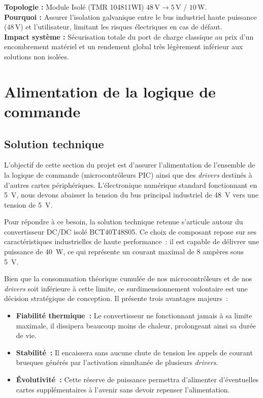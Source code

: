 \begin{decisionbox}
\textbf{Topologie :} Module Isolé (TMR 104811WI) $48 \, \text{V} \to 5 \, \text{V}$ / $10 \, \text{W}$. \\
\textbf{Pourquoi :} Assurer l'isolation galvanique entre le bus industriel haute puissance ($48 \, \text{V}$) et l'utilisateur, limitant les risques électriques en cas de défaut. \\
\textbf{Impact système :} Sécurisation totale du port de charge classique au prix d'un encombrement matériel et un rendement global très légèrement inférieur aux solutions non isolées.
\end{decisionbox}

    \section{Alimentation de la logique de commande}
        \subsection{Solution technique}
        L'objectif de cette section du projet est d'assurer l'alimentation de l'ensemble de la logique de commande (microcontrôleurs PIC) ainsi que des \textit{drivers} destinés à d'autres cartes périphériques. L'électronique numérique standard fonctionnant en 5~V, nous devons abaisser la tension du bus principal industriel de 48~V vers une tension de 5~V.

        Pour répondre à ce besoin, la solution technique retenue s'articule autour du convertisseur DC/DC isolé BCT40T48S05. Ce choix de composant repose sur ses caractéristiques industrielles de haute performance~: il est capable de délivrer une puissance de 40~W, ce qui représente un courant maximal de 8 ampères sous 5~V.

        Bien que la consommation théorique cumulée de nos microcontrôleurs et de nos \textit{drivers} soit inférieure à cette limite, ce surdimensionnement volontaire est une décision stratégique de conception. Il présente trois avantages majeurs~:
        \begin{itemize}
            \item \textbf{Fiabilité thermique~:} Le convertisseur ne fonctionnant jamais à sa limite maximale, il dissipera beaucoup moins de chaleur, prolongeant ainsi sa durée de vie.
            \item \textbf{Stabilité~:} Il encaissera sans aucune chute de tension les appels de courant brusques générés par l'activation simultanée de plusieurs \textit{drivers}.
            \item \textbf{Évolutivité~:} Cette réserve de puissance permettra d'alimenter d'éventuelles cartes supplémentaires à l'avenir sans devoir repenser l'alimentation.
        \end{itemize}

